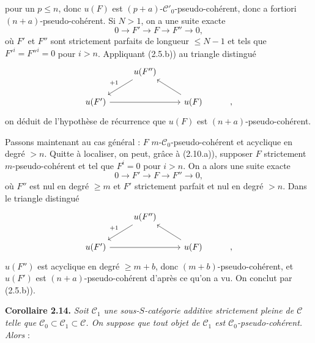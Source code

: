 pour un \(p\leq n\), donc \(u(F)\) est \((p+a)\)-\(\mathcal C'_0\)-pseudo-cohérent, donc a fortiori \((n+a)\)-pseudo-cohérent. Si \(N>1\), on a une suite exacte
\[
  0\longrightarrow F'\longrightarrow F\longrightarrow F''\longrightarrow 0,
\]
où \(F'\) et \(F''\) sont strictement parfaits de longueur \(\leq N-1\) et tels que \(F'^i=F''^i=0\) pour \(i>n\). Appliquant (2.5.b)) au triangle distingué
\[
\begin{tikzcd}
& u(F'') \arrow[dl,"+1"'] & \\
u(F') \arrow[rr] && u(F) \arrow[ul] & ,
\end{tikzcd}
\]
on déduit de l'hypothèse de récurrence que \(u(F)\) est \((n+a)\)-pseudo-cohérent.

Passons maintenant au cas général : \(F\) \(m\)-\(\mathcal C_0\)-pseudo-cohérent et acyclique en degré \(>n\). Quitte à localiser, on peut, grâce à (2.10.a)), supposer \(F\) strictement \(m\)-pseudo-cohérent et tel que \(F^i=0\) pour \(i>n\). On a alors une suite exacte
\[
  0\longrightarrow F'\longrightarrow F\longrightarrow F''\longrightarrow 0,
\]
où \(F''\) est nul en degré \(\geq m\) et \(F'\) strictement parfait et nul en degré \(>n\). Dans le triangle distingué
\[
\begin{tikzcd}
& u(F'') \arrow[dl,"+1"'] & \\
u(F') \arrow[rr] && u(F) \arrow[ul] & ,
\end{tikzcd}
\]
\(u(F'')\) est acyclique en degré \(\geq m+b\), donc \((m+b)\)-pseudo-cohérent, et \(u(F')\) est \((n+a)\)-pseudo-cohérent d'après ce qu'on a vu. On conclut par (2.5.b)).

\textbf{Corollaire 2.14.} \emph{Soit \(\mathcal C_1\) une sous-\(S\)-catégorie additive strictement pleine de \(\mathcal C\) telle que \(\mathcal C_0\subset\mathcal C_1\subset\mathcal C\). On suppose que tout objet de \(\mathcal C_1\) est \(\mathcal C_0\)-pseudo-cohérent.}
\emph{Alors} :

